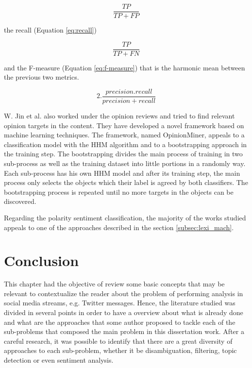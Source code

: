 \begin{equation} \label{eq:precision}
\frac{TP}{TP+FP}
\end{equation}

the recall (Equation \ref{eq:recall})

\begin{equation} \label{eq:recall}
\frac{TP}{TP+FN}
\end{equation}

and the F-measure (Equation \ref{eq:f-measure}) that is the harmonic mean between the previous two metrics.

\begin{equation} \label{eq:f-measure}
2.\frac{precision.recall}{precision+recall}
\end{equation}

W. Jin et al. \cite{kn:Jin2009} also worked under the opinion reviews and tried to find relevant opinion targets in the content. They have developed a novel framework based on machine learning techniques. The framework, named OpinionMiner, appeals to a classification model with the HHM algorithm and to a bootstrapping approach in the training step. The bootstrapping divides the main process of training in two sub-process as well as the training dataset into little portions in a randomly way. Each sub-process has his own HHM model and after its training step, the main process only selects the objects which their label is agreed by both classifiers. The bootstrapping process is repeated until no more targets in the objects can be discovered.

Regarding the polarity sentiment classification, the majority of the works studied appeals to one of the approaches described in the section \ref{subsec:lexi_mach}.

\section{Conclusion}

This chapter had the objective of review some basic concepts that may be relevant to contextualize the reader about the problem of performing analysis in social media streams, e.g. Twitter messages. Hence, the literature studied was divided in several points in order to have a overview about what is already done and what are the approaches that some author proposed to tackle each of the sub-problems that composed the main problem in this dissertation work.
After a careful research, it was possible to identify that there are a great diversity of approaches to each sub-problem, whether it be disambiguation, filtering, topic detection or even sentiment analysis.

